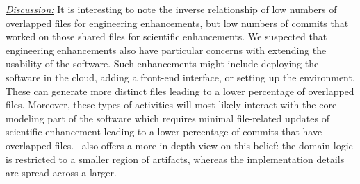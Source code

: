 \documentclass[conference,10pt]{IEEEtran}
\begin{document}
\begin{table}[!t]
\vspace{-10pt}
\centering
\caption{Given $N$ numbers of projects, the percentage of projects having overlapping percentage above a certain threshold (25\%, 33\%, 50\%) are reported for both Scientific and Engineering development.}\label{tbl:separation}
\footnotesize
{}
\vspace{-15pt}
\end{table} 

\noindent \textit{\underline{Discussion:}}  It is interesting to note the inverse relationship of low numbers of overlapped files for engineering enhancements, but low numbers of commits that worked on those shared files for scientific enhancements. We suspected that engineering enhancements also have particular concerns with extending the usability of the software. Such enhancements might include deploying the software in the cloud, adding a front-end interface, or setting up the environment. These can generate more distinct files leading to a lower percentage of overlapped files. Moreover, these types of activities will most likely interact with the core modeling part of the software which requires minimal file-related updates of scientific enhancement leading to a lower percentage of commits that have overlapped files.~ also offers a more in-depth view on this belief: the domain logic is restricted to a smaller region of artifacts, whereas the implementation details are spread across a larger.
\end{document}
